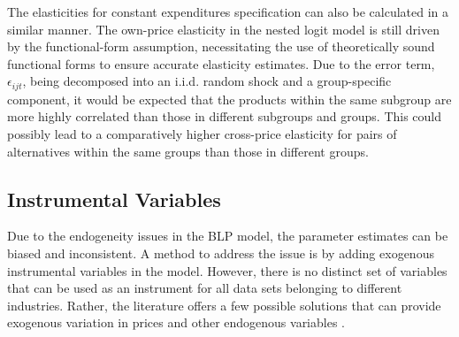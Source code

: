 \documentclass[a4paper,11pt]{article}
\begin{document}
    The elasticities for constant expenditures specification can also be calculated in a similar manner. The own-price elasticity in the nested logit model is still driven by the functional-form assumption, necessitating the use of theoretically sound functional forms to ensure accurate elasticity estimates. Due to the error term, $\epsilon_{ijt}$, being decomposed into an i.i.d. random shock and a group-specific component, it would be expected that the products within the same subgroup are more highly correlated than those in different subgroups and groups. This could possibly lead to a comparatively higher cross-price elasticity for pairs of alternatives within the same groups than those in different groups.
    
\newpage
\subsection{Instrumental Variables}
\label{subsec: IV}

    Due to the endogeneity issues in the BLP model, the parameter estimates can be biased and inconsistent. A method to address the issue is by adding exogenous instrumental variables in the model. However, there is no distinct set of variables that can be used as an instrument for all data sets belonging to different industries. Rather, the literature offers a few possible solutions that can provide exogenous variation in prices and other endogenous variables \cite{BerryandHaile}.
\end{document}
